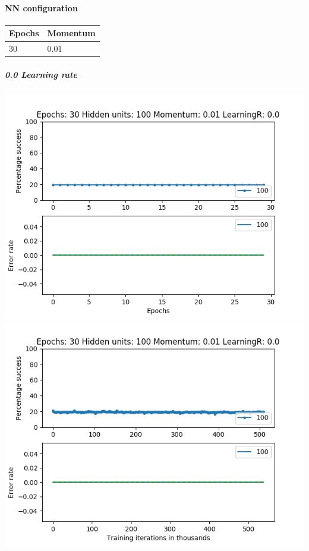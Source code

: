 \documentclass[11pt]{article}
\makeatletter
\def\maxwidth{\ifdim\Gin@nat@width>\linewidth\linewidth
    \else\Gin@nat@width\fi}
\let\Oldincludegraphics\includegraphics
\renewcommand{\includegraphics}[1]{\Oldincludegraphics[width=.8\maxwidth]{#1}}
\makeatother
\begin{document}
    \hypertarget{nn-configuration}{%
\paragraph{NN configuration}\label{nn-configuration}}

\begin{longtable}[]{@{}ll@{}}
\toprule
Epochs & Momentum\tabularnewline
\midrule
\endhead
30 & 0.01\tabularnewline
\bottomrule
\end{longtable}

\hypertarget{learning-rate}{%
\subparagraph{0.0 Learning rate}\label{learning-rate}}

\includegraphics{Experiment2/E2_NN_Epoch_Momentum_0.01_30Epochs_100_LR_0.0_Hiddenunits.png}
\includegraphics{Experiment2/E2_NN_Training_Momentum_0.01_30Epochs_100_LR_0.0_Hiddenunits.png}
\end{document}
